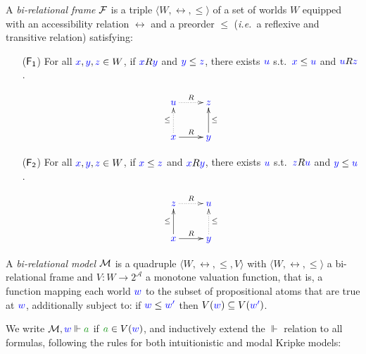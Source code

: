 \documentclass[a4paper]{article}
\begin{document}
 \begin{definition}
 	A \emph{bi-relational frame} $\mathcal{F}$ is a triple $\langle W, \rel, \le \rangle$ 
 	of a set of worlds $W$ equipped with an {accessibility relation} $\rel$ and a preorder $\le$ (\emph{i.e.}\ a reflexive and transitive relation) satisfying:
 	\begin{enumerate}
 		\item[($\mathsf{F_1}$)] For all ${\color{blue}{x}}, {\color{blue}{y}}, {\color{blue}{z}} \in W$, if ${\color{blue}{x}}R{\color{blue}{y}}$ and ${\color{blue}{y}}\le{{\color{blue}{z}}}$, there exists ${\color{blue}{u}}$ s.t.~${\color{blue}{x}}\le{{\color{blue}{u}}}$ and ${\color{blue}{u}}R{\color{blue}{z}}$.
 		
 		\begin{equation*}
 			\xymatrix{
 				\lb u \ar@{.>}[r]^R  & \lb z \\
 				\lb x \ar@{.>}[u]^{\le} \ar@{->}[r]^R  & \lb y \ar@{->}[u]_{\le}
 			}
 		\end{equation*}
 		
 		\item[($\mathsf{F_2}$)] For all ${\color{blue}{x}}, {\color{blue}{y}}, {\color{blue}{z}} \in W$, if ${\color{blue}{x}}\le{{\color{blue}{z}}}$ and ${\color{blue}{x}}R{\color{blue}{y}}$, there exists ${\color{blue}{u}}$ s.t.~${\color{blue}{z}}R{\color{blue}{u}}$ and ${\color{blue}{y}}\le{{\color{blue}{u}}}$.
 		
 		\begin{equation*}
 			\xymatrix{
 				\lb z\ar@{.>}[r]^R & \lb u \\
 				\lb x \ar@{->}[u]^{\le} \ar@{->}[r]^R & \lb y \ar@{.>}[u]_{\le}
 			}
 		\end{equation*}
 	\end{enumerate}
 \end{definition}
 
 \begin{definition}
 	\label{model}
 	A \emph{bi-relational model} $\mathcal{M}$ is a quadruple $\langle W, \rel,\le,V \rangle$ with $\langle W, \rel, \le \rangle$ a bi-relational frame and $V\colon W \to 2^\mathcal{A}$ a monotone valuation function, that is, a function mapping each world ${\color{blue}{w}}$ to the subset of propositional atoms that are true at ${\color{blue}{w}}$, additionally subject to:
 	if ${\color{blue}{w}} \le {\color{blue}{w'}}$ then $V({\color{blue}{w}})\subseteq V({\color{blue}{w'}})$.
 \end{definition}
 
 We write $\M, \lb w \Vdash \fm a$ if $\fm a \in V(\lb w)$, and inductively extend the $\Vdash$ relation to all formulas, following the rules for both intuitionistic and modal Kripke models:
 
\end{document}
